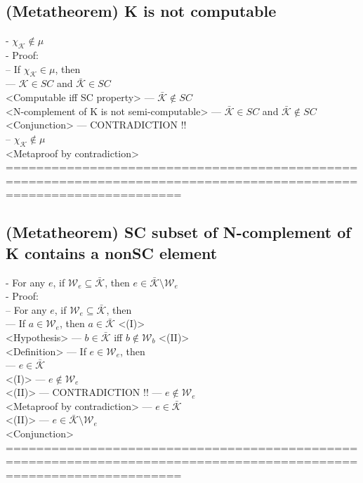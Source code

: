 \documentclass{book}
\newcommand{\inot}{\not}
\begin{document}
\subsection{(Metatheorem) K is not computable} %
	- $\chi_{\mathcal{K}} \inot \in \mu$ \\
	- Proof: \\
		-- If $\chi_{\mathcal{K}} \in \mu$, then \\
			--- $\mathcal{K} \in SC$ and $\bar{\mathcal{K}} \in SC$ \\ <Computable iff SC property>
			--- $\bar{\mathcal{K}} \inot \in SC$ \\ <N-complement of K is not semi-computable>
			--- $\bar{\mathcal{K}} \in SC$ and $\bar{\mathcal{K}} \inot \in SC$ \\ <Conjunction>
			--- CONTRADICTION !! \\
		-- $\chi_{\mathcal{K}} \inot \in \mu$ \\ <Metaproof by contradiction>
	===================================================================================================================
\subsection{(Metatheorem) SC subset of N-complement of K contains a nonSC element} %
	- For any $e$, if $\mathcal{W}_e \subseteq \bar{\mathcal{K}}$, then $e \in \bar{\mathcal{K}} \setminus \mathcal{W}_e$	\\
	- Proof: \\
		-- For any $e$, if $\mathcal{W}_e \subseteq \bar{\mathcal{K}}$, then \\
			--- If $a \in \mathcal{W}_e$, then $a \in \bar{\mathcal{K}}$ <(I)> \\ <Hypothesis>
			--- $b \in \bar{\mathcal{K}}$ iff $b \inot \in \mathcal{W}_b$ <(II)> \\ <Definition>
			--- If $e \in \mathcal{W}_e$, then \\
				--- $e \in \bar{\mathcal{K}}$ \\ <(I)>
				--- $e \inot \in \mathcal{W}_e$ \\ <(II)>
				--- CONTRADICTION !!
			--- $e \inot \in \mathcal{W}_e$ \\ <Metaproof by contradiction>
			--- $e \in \bar{\mathcal{K}}$ \\ <(II)>
			--- $e \in \bar{\mathcal{K}} \setminus \mathcal{W}_e$ \\ <Conjunction>
	===================================================================================================================
\end{document}
